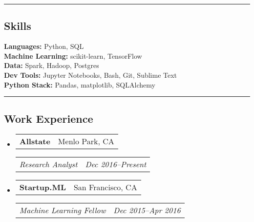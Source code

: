 \documentclass[10pt,letterpaper]{article}
\makeatletter
\newenvironment{indentsection}[1]%
{\begin{list}{}%
	{\setlength{\leftmargin}{#1}}%
	\item[]%
}
{\end{list}}
\newcommand{\headerrow}[2]
{\begin{tabular*}{\linewidth}{l@{\extracolsep{\fill}}r}
	#1 &
	#2 \\
\end{tabular*}}
\makeatother
\begin{document}
\hrule
\subsection*{Skills}
	\begin{indentsection}{\parindent}
		\textbf{Languages:} Python, SQL \\
		\textbf{Machine Learning:} scikit-learn, TensorFlow \\	
		\textbf{Data:} Spark, Hadoop, Postgres \\
		\textbf{Dev Tools:} Jupyter Notebooks, Bash, Git,  Sublime Text \\  
		\textbf{Python Stack:} Pandas, matplotlib, SQLAlchemy
	\end{indentsection}

\hrule
\subsection*{Work Experience}
\begin{itemize}
	\parskip=-0.1em
	\item
	\headerrow
		{\textbf{Allstate}}
		{Menlo Park, CA}
	\headerrow
		{\emph{Research Analyst}}
		{\emph{Dec 2016--Present}}
\end{itemize}

\begin{itemize}
	\parskip=-0.1em
	\item
	\headerrow
		{\textbf{Startup.ML}}
		{San Francisco, CA}
	\headerrow
		{\emph{Machine Learning Fellow}}
		{\emph{Dec 2015--Apr 2016}}
\end{itemize}
\end{document}
